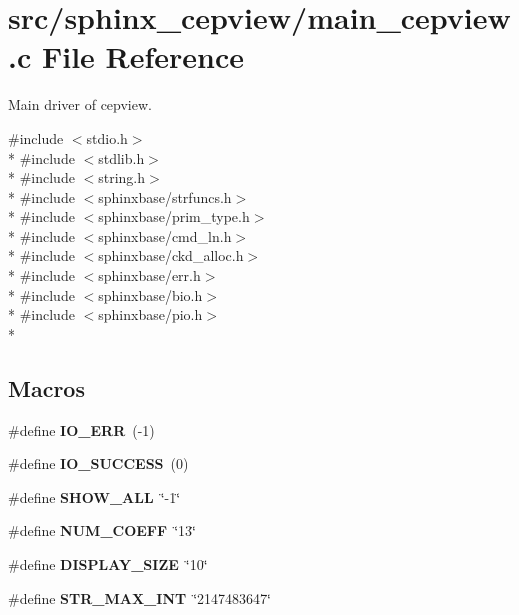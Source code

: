\section{src/sphinx\+\_\+cepview/main\+\_\+cepview.c File Reference}
\label{main__cepview_8c}


Main driver of cepview.  


{\ttfamily \#include $<$stdio.\+h$>$}\\*
{\ttfamily \#include $<$stdlib.\+h$>$}\\*
{\ttfamily \#include $<$string.\+h$>$}\\*
{\ttfamily \#include $<$sphinxbase/strfuncs.\+h$>$}\\*
{\ttfamily \#include $<$sphinxbase/prim\+\_\+type.\+h$>$}\\*
{\ttfamily \#include $<$sphinxbase/cmd\+\_\+ln.\+h$>$}\\*
{\ttfamily \#include $<$sphinxbase/ckd\+\_\+alloc.\+h$>$}\\*
{\ttfamily \#include $<$sphinxbase/err.\+h$>$}\\*
{\ttfamily \#include $<$sphinxbase/bio.\+h$>$}\\*
{\ttfamily \#include $<$sphinxbase/pio.\+h$>$}\\*
\subsection*{Macros}
\begin{DoxyCompactItemize}
\item 
\#define {\bfseries I\+O\+\_\+\+E\+R\+R}~(-\/1)\label{main__cepview_8c_a2f594e19531c324dd254ba0cc712044d}

\item 
\#define {\bfseries I\+O\+\_\+\+S\+U\+C\+C\+E\+S\+S}~(0)\label{main__cepview_8c_adad481c8f8fcb43725ccb11be5c690f4}

\item 
\#define {\bfseries S\+H\+O\+W\+\_\+\+A\+L\+L}~\char`\"{}-\/1\char`\"{}\label{main__cepview_8c_aaddcd19f0e123722b857ec68d1d3e156}

\item 
\#define {\bfseries N\+U\+M\+\_\+\+C\+O\+E\+F\+F}~\char`\"{}13\char`\"{}\label{main__cepview_8c_a56e7544225bcd9da32fa61cde6e6f523}

\item 
\#define {\bfseries D\+I\+S\+P\+L\+A\+Y\+\_\+\+S\+I\+Z\+E}~\char`\"{}10\char`\"{}\label{main__cepview_8c_a035c0b93babde37c8919064af8b67928}

\item 
\#define {\bfseries S\+T\+R\+\_\+\+M\+A\+X\+\_\+\+I\+N\+T}~\char`\"{}2147483647\char`\"{}\label{main__cepview_8c_a01f1f09f8562ef6971aa38c4f8f32954}

\end{DoxyCompactItemize}
